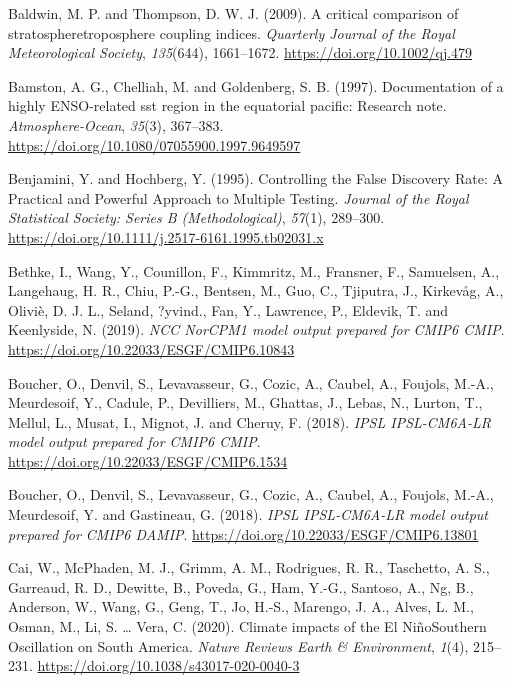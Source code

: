 \documentclass[12pt,oneside,a4paper]{reedthesis}
\newlength{\cslhangindent}
\newenvironment{CSLReferences}[2] %
 {%
  \setlength{\parindent}{0pt}
  \ifodd #1 \everypar{\setlength{\hangindent}{\cslhangindent}}\ignorespaces\fi
  \ifnum #2 > 0
  \setlength{\parskip}{#2\baselineskip}
  \fi
 }%
 {}
\begin{document}
\begin{CSLReferences}{1}{0}
\leavevmode{}%
Baldwin, M. P. and Thompson, D. W. J. (2009). A critical comparison of stratosphere{\textendash}troposphere coupling indices. \emph{Quarterly Journal of the Royal Meteorological Society}, \emph{135}(644), 1661--1672. \url{https://doi.org/10.1002/qj.479}

\leavevmode{}%
Bamston, A. G., Chelliah, M. and Goldenberg, S. B. (1997). Documentation of a highly {ENSO}-related sst region in the equatorial pacific: {Research} note. \emph{Atmosphere-Ocean}, \emph{35}(3), 367--383. \url{https://doi.org/10.1080/07055900.1997.9649597}

\leavevmode{}%
Benjamini, Y. and Hochberg, Y. (1995). Controlling the {False Discovery Rate}: {A Practical} and {Powerful Approach} to {Multiple Testing}. \emph{Journal of the Royal Statistical Society: Series B (Methodological)}, \emph{57}(1), 289--300. \url{https://doi.org/10.1111/j.2517-6161.1995.tb02031.x}

\leavevmode{}%
Bethke, I., Wang, Y., Counillon, F., Kimmritz, M., Fransner, F., Samuelsen, A., Langehaug, H. R., Chiu, P.-G., Bentsen, M., Guo, C., Tjiputra, J., Kirkevåg, A., Oliviè, D. J. L., Seland, ?yvind., Fan, Y., Lawrence, P., Eldevik, T. and Keenlyside, N. (2019). \emph{NCC NorCPM1 model output prepared for CMIP6 CMIP}. \url{https://doi.org/10.22033/ESGF/CMIP6.10843}

\leavevmode{}%
Boucher, O., Denvil, S., Levavasseur, G., Cozic, A., Caubel, A., Foujols, M.-A., Meurdesoif, Y., Cadule, P., Devilliers, M., Ghattas, J., Lebas, N., Lurton, T., Mellul, L., Musat, I., Mignot, J. and Cheruy, F. (2018). \emph{IPSL IPSL-CM6A-LR model output prepared for CMIP6 CMIP}. \url{https://doi.org/10.22033/ESGF/CMIP6.1534}

\leavevmode{}%
Boucher, O., Denvil, S., Levavasseur, G., Cozic, A., Caubel, A., Foujols, M.-A., Meurdesoif, Y. and Gastineau, G. (2018). \emph{IPSL IPSL-CM6A-LR model output prepared for CMIP6 DAMIP}. \url{https://doi.org/10.22033/ESGF/CMIP6.13801}

\leavevmode{}%
Cai, W., McPhaden, M. J., Grimm, A. M., Rodrigues, R. R., Taschetto, A. S., Garreaud, R. D., Dewitte, B., Poveda, G., Ham, Y.-G., Santoso, A., Ng, B., Anderson, W., Wang, G., Geng, T., Jo, H.-S., Marengo, J. A., Alves, L. M., Osman, M., Li, S. \ldots{} Vera, C. (2020). Climate impacts of the {El Ni{ñ}o}{\textendash}{Southern Oscillation} on {South America}. \emph{Nature Reviews Earth \& Environment}, \emph{1}(4), 215--231. \url{https://doi.org/10.1038/s43017-020-0040-3}


\end{CSLReferences}
\end{document}
